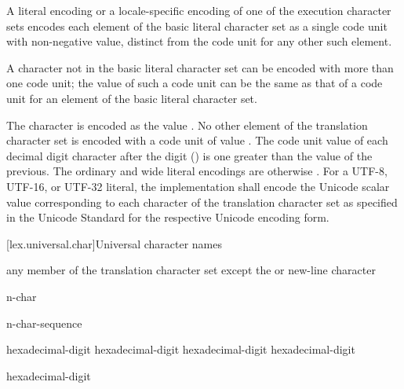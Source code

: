 \pnum
A literal encoding or a locale-specific encoding of one of
the execution character sets
encodes each element of the basic literal character set as
a single code unit with non-negative value,
distinct from the code unit for any other such element.
\begin{note}
A character not in the basic literal character set
can be encoded with more than one code unit;
the value of such a code unit can be the same as
that of a code unit for an element of the basic literal character set.
\end{note}
%
%
The  character is encoded as the value .
No other element of the translation character set
is encoded with a code unit of value .
The code unit value of each decimal digit character after the digit  ()
is one greater than the value of the previous.
The ordinary and wide literal encodings are otherwise
.
%
%
%
For a UTF-8, UTF-16, or UTF-32 literal,
the implementation shall encode
the Unicode scalar value
corresponding to each character of the translation character set
as specified in the Unicode Standard
for the respective Unicode encoding form.

[lex.universal.char]{Universal character names}

\begin{bnf}
\br
     \textnormal{any member of the translation character set except the  or new-line character}
\end{bnf}

\begin{bnf}
\br
    n-char 
\end{bnf}

\begin{bnf}
\br
     n-char-sequence \terminal{\}}
\end{bnf}

\begin{bnf}
\br
    hexadecimal-digit hexadecimal-digit hexadecimal-digit hexadecimal-digit
\end{bnf}

\begin{bnf}
\br
    hexadecimal-digit 
\end{bnf}

